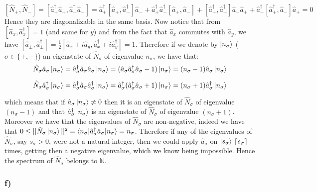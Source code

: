\documentclass[10pt,a4paper]{book}
\DeclarePairedDelimiter{\ceil}{\lceil}{\rceil}
\begin{document}
$$[\hat{N}_{+},\hat{N}_-]=[\hat{a}_+^{\dagger}\hat{a}_+,\hat{a}_-^{\dagger}\hat{a}_-]=\hat{a}_+^{\dagger}[\hat{a}_+,\hat{a}_-^{\dagger}]\hat{a}_-+
\hat{a}_+^{\dagger}\hat{a}_-^{\dagger}[\hat{a}_+,\hat{a}_-]+[\hat{a}_+^{\dagger},\hat{a}_-^{\dagger}]\hat{a}_-\hat{a}_++\hat{a}_-^{\dagger}[\hat{a}_+^{\dagger},\hat{a}_-]\hat{a}_+=0
$$
Hence they are diagonalizable in the same basis.
Now notice that from $[\hat{a}_x,\hat{a}_x^{\dagger}]=1$ (and same for $y$) and from the fact that $\hat{a}_x$ commutes with $\hat{a}_y$, we have $[\hat{a}_{\pm},\hat{a}_{\pm}^{\dagger}]=\frac{1}{2}[\hat{a}_x\pm i\hat{a}_y,\hat{a}_x^{\dagger}\mp i\hat{a}_y^{\dagger}]=1$.
Therefore if we denote by $\ket{n_{\sigma}}$ ($\sigma\in\{+,-\}$) an eigenstate of $\hat{N}_{\sigma}$ of eigenvalue $n_{\sigma}$, we have that:
$$\hat{N}_{\sigma}\hat{a}_{\sigma}\ket{n_{\sigma}}=\hat{a}_{\sigma}^{\dagger}\hat{a}_{\sigma}\hat{a}_{\sigma}\ket{n_{\sigma}}=(\hat{a}_{\sigma}\hat{a}_{\sigma}^{\dagger}\hat{a}_{\sigma}-1)\ket{n_{\sigma}}=(n_{\sigma}-1)\hat{a}_{\sigma}\ket{n_{\sigma}}$$

$$\hat{N}_{\sigma}\hat{a}_{\sigma}^{\dagger}\ket{n_{\sigma}}=\hat{a}_{\sigma}^{\dagger}\hat{a}_{\sigma}\hat{a}_{\sigma}^{\dagger}\ket{n_{\sigma}}=\hat{a}_{\sigma}^{\dagger}(\hat{a}_{\sigma}^{\dagger}\hat{a}_{\sigma}+1)\ket{n_{\sigma}}=(n_{\sigma}+1)\hat{a}_{\sigma}^{\dagger}\ket{n_{\sigma}}$$

which means that if $\hat{a}_{\sigma}\ket{n_{\sigma}}\neq 0$ then it is an eigenstate of $\hat{N}_{\sigma}$ of eigenvalue $(n_{\sigma}-1)$ and that $\hat{a}_{\sigma}^{\dagger}\ket{n_{\sigma}}$ is an eigenstate of $\hat{N}_{\sigma}$ of eigenvalue $(n_{\sigma}+1)$. Moreover we have that the eigenvalues of $\hat{N}_{\sigma}$ are non-negative, indeed we have that $0\leq ||\hat{N}_{\sigma}\ket{n_{\sigma}}||^2=\braket{n_{\sigma}|\hat{a}_{\sigma}^{\dagger}\hat{a}_{\sigma}|n_{\sigma}}=n_{\sigma}$. Therefore if any of the eigenvalues of $\hat{N}_{\sigma}$, say $s_{\sigma}>0$, were not a natural integer, then we could apply $\hat{a}_{\sigma}$ on $\ket{s_{\sigma}}$ $\ceil*{s_{\sigma}}$ times, getting then a negative eigenvalue, which we know being impossible. Hence the spectrum of $\hat{N}_{\sigma}$ belongs to $\mathbb{N}$.


\subsubsection{f)}
\end{document}
